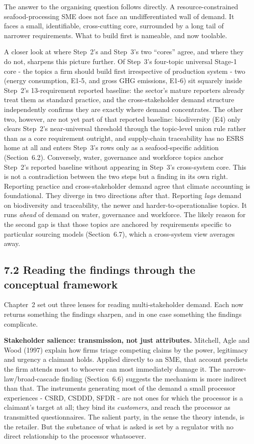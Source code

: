 \documentclass[
]{article}
\begin{document}
The answer to the organising question follows directly. A resource-constrained
seafood-processing SME does not face an undifferentiated wall of demand. It faces a
small, identifiable, cross-cutting core, surrounded by a long tail of narrower
requirements. What to build first is nameable, and now toolable.

A closer look at where Step~2's and Step~3's two ``cores'' agree, and where
they do not, sharpens this picture further. Of Step~3's four-topic universal
Stage-1 core - the topics a firm should build first irrespective of
production system - two (energy consumption, E1-5, and gross GHG
emissions, E1-6) sit squarely inside Step~2's 13-requirement reported
baseline: the sector's mature reporters already treat them as standard
practice, and the cross-stakeholder demand structure independently confirms
they are exactly where demand concentrates. The other two, however, are not
yet part of that reported baseline: biodiversity (E4) only clears Step~2's
near-universal threshold through the topic-level union rule rather than as a
core requirement outright, and supply-chain traceability has no ESRS home at
all and enters Step~3's rows only as a seafood-specific addition
(Section~6.2). Conversely, water, governance and workforce topics anchor
Step~2's reported baseline without appearing in Step~3's cross-system
core. This is not a contradiction between the two steps but a finding in its
own right. Reporting practice and cross-stakeholder demand agree that climate
accounting is foundational. They diverge in two directions after that.
Reporting \emph{lags} demand on biodiversity and traceability, the newer and
harder-to-operationalise topics. It runs \emph{ahead} of demand on water,
governance and workforce. The likely reason for the second gap is that those
topics are anchored by requirements specific to particular sourcing models
(Section~6.7), which a cross-system view averages away.

\subsection{7.2 Reading the findings through the conceptual
framework}\label{discussion-theory}

Chapter~2 set out three lenses for reading multi-stakeholder demand. Each now
returns something the findings sharpen, and in one case something the findings
complicate.

\textbf{Stakeholder salience: transmission, not just attributes.} Mitchell, Agle
and Wood (1997) explain how firms triage competing claims by the power, legitimacy
and urgency a claimant holds. Applied directly to an SME, that account predicts
the firm attends most to whoever can most immediately damage it. The
narrow-law/broad-cascade finding (Section~6.6) suggests the mechanism is more
indirect than that. The instruments generating most of the demand a small
processor experiences - CSRD, CSDDD, SFDR - are not ones for which the processor
is a claimant's target at all; they bind its \emph{customers}, and reach the
processor as transmitted questionnaires. The salient party, in the sense the
theory intends, is the retailer. But the substance of what is asked is set by a
regulator with no direct relationship to the processor whatsoever.
\end{document}
